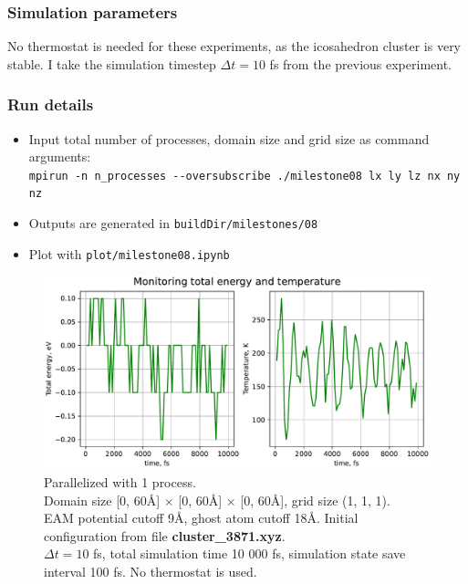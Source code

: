 \documentclass[12pt,a4paper]{article}
\begin{document}
\subsubsection*{Simulation parameters}

No thermostat is needed for these experiments, as the icosahedron cluster is very stable. I take the simulation timestep $\Delta t = 10$ fs from the previous experiment. 



\subsubsection*{Run details}
\begin{itemize}
	\item Input total number of processes, domain size and grid size as command arguments:\\
	\verb|mpirun -n n_processes --oversubscribe ./milestone08 lx ly lz nx ny nz|
	\item Outputs are generated in \verb|buildDir/milestones/08|
	\item Plot with \verb|plot/milestone08.ipynb|
\end{itemize}

\begin{figure}[h!]
	\centering
	\includegraphics[width=.8\linewidth]{img/milestone08-1proc.pdf}
	\caption{Parallelized with 1 process.\\
	Domain size [0, 60Å] $\times$ [0, 60Å] $\times$ [0, 60Å], grid size (1, 1, 1).\\
	EAM potential cutoff 9Å, ghost atom cutoff 18Å. Initial configuration from file {\bf cluster\_3871.xyz}.\\
	$\Delta t = 10$ fs, total simulation time 10 000 fs, simulation state save interval 100 fs. No thermostat is used.}
	\label{fig:parallel-1}
\end{figure}
\end{document}
